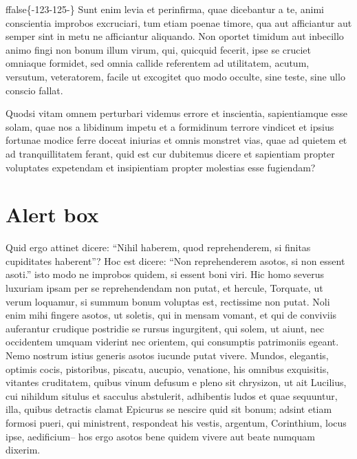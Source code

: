 \documentclass[twoside]{extreport}
\begin{document}
\begin{exampleblock}{}
ffalse\{-123-125-\}\fi{} Sunt enim levia et perinfirma, quae dicebantur a te,
animi conscientia improbos excruciari, tum etiam poenae timore, qua aut
afficiantur aut semper sint in metu ne afficiantur aliquando. Non
oportet timidum aut inbecillo animo fingi non bonum illum virum, qui,
quicquid fecerit, ipse se cruciet omniaque formidet, sed omnia callide
referentem ad utilitatem, acutum, versutum, veteratorem, facile ut
excogitet quo modo occulte, sine teste, sine ullo conscio fallat.

Quodsi vitam omnem perturbari videmus errore et
inscientia, sapientiamque esse solam, quae nos a libidinum impetu et a
formidinum terrore vindicet et ipsius fortunae modice ferre doceat
iniurias et omnis monstret vias, quae ad quietem et ad tranquillitatem
ferant, quid est cur dubitemus dicere et sapientiam propter voluptates
expetendam et insipientiam propter molestias esse fugiendam?
\end{exampleblock}

\hypertarget{alert-box}{%
\section{Alert box}\label{alert-box}}

Quid ergo attinet dicere: ``Nihil haberem, quod reprehenderem, si
finitas cupiditates haberent''? Hoc est dicere: ``Non reprehenderem
asotos, si non essent asoti.'' isto modo ne improbos quidem, si essent
boni viri. Hic homo severus luxuriam ipsam per se reprehendendam non
putat, et hercule, Torquate, ut verum loquamur, si summum bonum voluptas
est, rectissime non putat. Noli enim mihi fingere asotos, ut soletis,
qui in mensam vomant, et qui de conviviis auferantur crudique postridie
se rursus ingurgitent, qui solem, ut aiunt, nec occidentem umquam
viderint nec orientem, qui consumptis patrimoniis egeant. Nemo nostrum
istius generis asotos iucunde putat vivere. Mundos, elegantis, optimis
cocis, pistoribus, piscatu, aucupio, venatione, his omnibus exquisitis,
vitantes cruditatem, quibus vinum defusum e pleno sit chrysizon, ut ait
Lucilius, cui nihildum situlus et sacculus abstulerit, adhibentis ludos
et quae sequuntur, illa, quibus detractis clamat Epicurus se nescire
quid sit bonum; adsint etiam formosi pueri, qui ministrent, respondeat
his vestis, argentum, Corinthium, locus ipse, aedificium-- hos ergo
asotos bene quidem vivere aut beate numquam dixerim.
\end{document}
